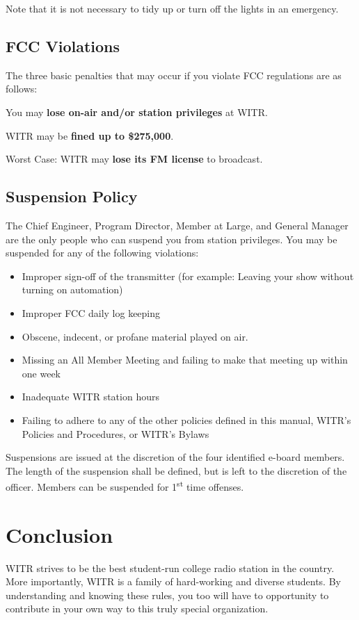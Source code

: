 \documentclass{witrman}
\begin{document}
Note that it is not necessary to tidy up or turn off the lights in an emergency.

\section{FCC Violations}
The three basic penalties that may occur if you violate FCC regulations are as
follows:
\begin{tightenumerate}
    \item You may \textbf{lose on-air and/or station privileges} at WITR\@.
    \item WITR may be \textbf{fined up to \$275,000}.
    \item Worst Case: WITR may \textbf{lose its FM license} to broadcast.
\end{tightenumerate}

\section{Suspension Policy}
The Chief Engineer, Program Director, Member at Large, and General Manager are
the only people who can suspend you from station privileges. You may be
suspended for any of the following violations:
\begin{itemize}
    \item Improper sign-off of the transmitter (for example: Leaving your show
        without turning on automation)
    \item Improper FCC daily log keeping
    \item Obscene, indecent, or profane material played on air.
    \item Missing an All Member Meeting and failing to make that meeting up
        within one week
    \item Inadequate WITR station hours
    \item Failing to adhere to any of the other policies defined in this manual,
        WITR’s Policies and Procedures, or WITR’s Bylaws
\end{itemize}

Suspensions are issued at the discretion of the four identified e-board members.
The length of the suspension shall be defined, but is left to the discretion of
the officer.  Members can be suspended for 1\textsuperscript{st} time offenses.

\pagebreak
\chapter{Conclusion}
WITR strives to be the best student-run college radio station in the country.
More importantly, WITR is a family of hard-working and diverse students. By
understanding and knowing these rules, you too will have to opportunity to
contribute in your own way to this truly special organization.

\makefooter{}
\end{document}
